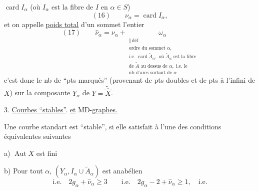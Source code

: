 $\operatorname{card}I_\alpha$ (où $I_\alpha$ est la fibre de $I$ en $\alpha\in S$)
\[
(16)\qquad\nu_\alpha=\operatorname{card}I_\alpha,
\]
et on appelle \uline{poids total} d'un sommet l'entier
\[
(17)\qquad\widehat\nu_\alpha=\nu_\alpha+
\underset{\substack{\Vert\ \mathrm{déf}\\
\text{ordre du sommet }\alpha,\\
\text{i.e. }\operatorname{card}\widetilde A_\alpha,\text{ où }\widetilde A_\alpha\text{ est la fibre}\\
\text{de }\widetilde A\text{ au dessus de }\alpha,\text{ i.e. le}\\
\text{nb d'arcs sortant de }\alpha}}{\omega_\alpha}
\]
c'est donc le nb de ``pts marqués'' (provenant de pts doubles et de pts à l'infini de $X$) sur la composante $Y_\alpha$ de $Y=\widetilde{\widehat X}$.

3. \uline{Courbes ``stables''}. \uline{et} MD-\uline{graphes.}

Une courbe standart  est ``stable'', si elle satisfait à l'une des conditions équivalentes suivantes

a) $\operatorname{Aut}X$ est fini

b) Pour tout $\alpha$, $(Y_\alpha,I_\alpha\cup\widetilde A_\alpha)$ est anabélien
\[
\text{i.e.}\quad 2g_\alpha+\widehat\nu_\alpha\geq3\qquad
\text{i.e.}\quad 2g_\alpha-2+\widehat\nu_\alpha\geq1,\quad\text{i.e.}
\]
